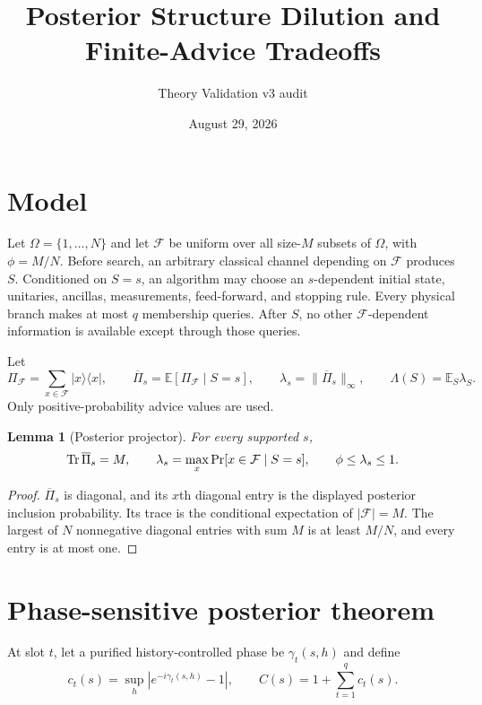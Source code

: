 \documentclass[11pt]{article}
\title{Posterior Structure Dilution and Finite-Advice Tradeoffs}
\author{Theory Validation v3 audit}
\date{August 29, 2026}
\newtheorem{lemma}{Lemma}
\newcommand{\F}{\mathcal F}
\newcommand{\E}{\mathbb E}
\newcommand{\Prb}{\mathop{\rm Pr}}
\begin{document}
\maketitle

\section{Model}
Let $\Omega=\{1,\ldots,N\}$ and let $\F$ be uniform over all size-$M$
subsets of $\Omega$, with $\phi=M/N$.  Before search, an arbitrary classical
channel depending on $\F$ produces $S$.  Conditioned on $S=s$, an algorithm
may choose an $s$-dependent initial state, unitaries, ancillas, measurements,
feed-forward, and stopping rule.  Every physical branch makes at most $q$
membership queries.  After $S$, no other $\F$-dependent information is
available except through those queries.

Let
\[
 \Pi_{\F}=\sum_{x\in\F}|x\rangle\!\langle x|,
 \qquad
 \overline\Pi_s=\E[\Pi_{\F}\mid S=s],
 \qquad
 \lambda_s=\|\overline\Pi_s\|_\infty,
 \qquad
 \Lambda(S)=\E_S\lambda_S.
\]
Only positive-probability advice values are used.

\begin{lemma}[Posterior projector]
For every supported $s$,
\[
 \operatorname{Tr}\overline\Pi_s=M,
 \qquad
 \lambda_s=\max_x\Prb[x\in\F\mid S=s],
 \qquad
 \phi\le\lambda_s\le1.
\]
\end{lemma}
\begin{proof}
$\overline\Pi_s$ is diagonal, and its $x$th diagonal entry is the displayed
posterior inclusion probability.  Its trace is the conditional expectation
of $|\F|=M$.  The largest of $N$ nonnegative diagonal entries with sum $M$
is at least $M/N$, and every entry is at most one.
\end{proof}

\section{Phase-sensitive posterior theorem}
At slot $t$, let a purified history-controlled phase be
$\gamma_t(s,h)$ and define
\[
 c_t(s)=\sup_h|e^{-i\gamma_t(s,h)}-1|,
 \qquad C(s)=1+\sum_{t=1}^q c_t(s).
\]
\end{document}
